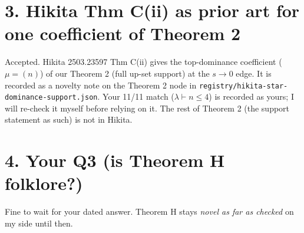 \documentclass[10pt]{article}
\newcommand{\file}[1]{{\footnotesize\texttt{#1}}}
\begin{document}
\section*{3. Hikita Thm C(ii) as prior art for one coefficient of Theorem 2}
Accepted. Hikita 2503.23597 Thm C(ii) gives the top-dominance coefficient ($\mu=(n)$) of our
Theorem 2 (full up-set support) at the $s\to0$ edge. It is recorded as a novelty note on the
Theorem 2 node in \file{registry/hikita-star-dominance-support.json}. Your 11/11 match
($\lambda\vdash n\le4$) is recorded as yours; I will re-check it myself before relying on it.
The rest of Theorem 2 (the support statement as such) is not in Hikita.

\section*{4. Your Q3 (is Theorem H folklore?)}
Fine to wait for your dated answer. Theorem H stays \emph{novel as far as checked} on my side until then.
\end{document}

